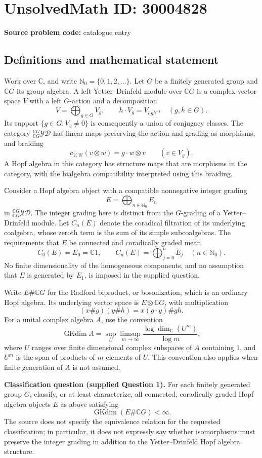 \documentclass[11pt]{article}
\newcommand{\C}{\mathbb{C}}
\begin{document}
\section*{UnsolvedMath ID: 30004828}
\textbf{Source problem code:} catalogue entry
\subsection{Definitions and mathematical statement}
Work over \(\C\), and write \(\mathbb N_0=\{0,1,2,\ldots\}\). Let \(G\) be a finitely generated group and \(\C G\) its group algebra. A left Yetter--Drinfeld module over \(\C G\) is a complex vector space \(V\) with a left \(G\)-action and a decomposition
\[
V=\bigoplus_{g\in G}V_g,
\qquad h\cdot V_g=V_{hgh^{-1}}\quad(g,h\in G).
\]
Its support \(\{g\in G:V_g\ne0\}\) is consequently a union of conjugacy classes. The category \({}^{\C G}_{\C G}\mathcal{YD}\) has linear maps preserving the action and grading as morphisms, and braiding
\[
c_{V,W}(v\otimes w)=g\cdot w\otimes v\qquad(v\in V_g).
\]
A Hopf algebra in this category has structure maps that are morphisms in the category, with the bialgebra compatibility interpreted using this braiding.

Consider a Hopf algebra object with a compatible nonnegative integer grading
\[
E=\bigoplus_{n\in\mathbb N_0}E_n
\]
in \({}^{\C G}_{\C G}\mathcal{YD}\). The integer grading here is distinct from the \(G\)-grading of a Yetter--Drinfeld module. Let \(C_n(E)\) denote the coradical filtration of its underlying coalgebra, whose zeroth term is the sum of its simple subcoalgebras. The requirements that \(E\) be connected and coradically graded mean
\[
C_0(E)=E_0=\C1,
\qquad C_n(E)=\bigoplus_{j=0}^{n}E_j\quad(n\in\mathbb N_0).
\]
No finite dimensionality of the homogeneous components, and no assumption that \(E\) is generated by \(E_1\), is imposed in the supplied question.

Write \(E\#\C G\) for the Radford biproduct, or bosonization, which is an ordinary Hopf algebra. Its underlying vector space is \(E\otimes\C G\), with multiplication
\[
(x\# g)(y\# h)=x(g\cdot y)\# gh.
\]
For a unital complex algebra \(A\), use the convention
\[
\operatorname{GKdim}A
=\sup_U\limsup_{m\to\infty}
\frac{\log\dim_{\C}(U^m)}{\log m},
\]
where \(U\) ranges over finite dimensional complex subspaces of \(A\) containing \(1\), and \(U^m\) is the span of products of \(m\) elements of \(U\). This convention also applies when finite generation of \(A\) is not assumed.

\textbf{Classification question (supplied Question 1).} For each finitely generated group \(G\), classify, or at least characterize, all connected, coradically graded Hopf algebra objects \(E\) as above satisfying
\[
\operatorname{GKdim}(E\#\C G)<\infty.
\]
The source does not specify the equivalence relation for the requested classification; in particular, it does not expressly say whether isomorphisms must preserve the integer grading in addition to the Yetter--Drinfeld Hopf algebra structure.
\end{document}
